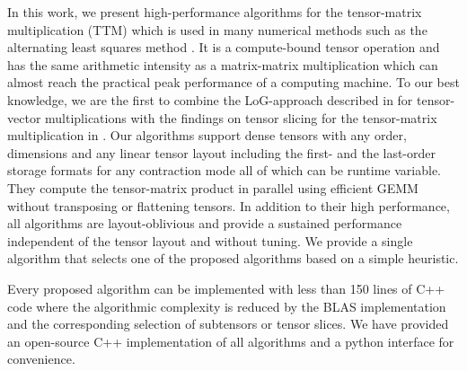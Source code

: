 In this work, we present high-performance algorithms for the tensor-matrix multiplication (TTM) which is used in many numerical methods such as the alternating least squares method \citep{lee:2018:fundamental, kolda:2009:decompositions}.
It is a compute-bound tensor operation and has the same arithmetic intensity as a matrix-matrix multiplication which can almost reach the practical peak performance of a computing machine.
To our best knowledge, we are the first to combine the LoG-approach described in \citep{bassoy:2019:ttv, pawlowski:2019:morton.tensor.computations} for tensor-vector multiplications with the findings on tensor slicing for the tensor-matrix multiplication in \citep{li:2015:input}.
Our algorithms support dense tensors with any order, dimensions and any linear tensor layout including the first- and the last-order storage formats for any contraction mode all of which can be runtime variable.
They compute the tensor-matrix product in parallel using efficient GEMM without transposing or flattening tensors.
In addition to their high performance, all algorithms are layout-oblivious and provide a sustained performance independent of the tensor layout and without tuning.
We provide a single algorithm that selects one of the proposed algorithms based on a simple heuristic.

Every proposed algorithm can be implemented with less than 150 lines of C++ code where the algorithmic complexity is reduced by the BLAS implementation and the corresponding selection of subtensors or tensor slices.
We have provided an open-source C++ implementation of all algorithms and a python interface for convenience.

